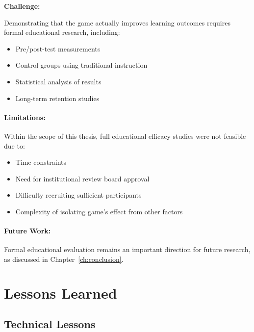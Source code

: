 \textbf{Challenge:}

Demonstrating that the game actually improves learning outcomes requires formal educational research, including:
\begin{itemize}
    \item Pre/post-test measurements
    \item Control groups using traditional instruction
    \item Statistical analysis of results
    \item Long-term retention studies
\end{itemize}

\paragraph*{Limitations:}

Within the scope of this thesis, full educational efficacy studies were not feasible due to:
\begin{itemize}
    \item Time constraints
    \item Need for institutional review board approval
    \item Difficulty recruiting sufficient participants
    \item Complexity of isolating game's effect from other factors
\end{itemize}

\paragraph*{Future Work:}

Formal educational evaluation remains an important direction for future research, as discussed in Chapter~\ref{ch:conclusion}.

\section{Lessons Learned}
\label{sec:lessons-learned}

\subsection{Technical Lessons}
\label{subsec:technical-lessons}

